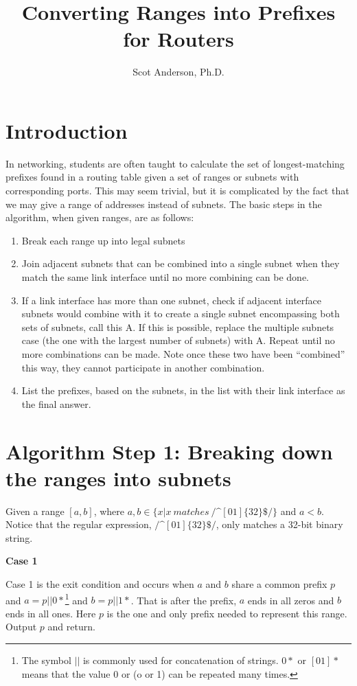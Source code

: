 \documentclass[pdf,bookmarks,colorlinks=true]{article}
\title{Converting Ranges into Prefixes for Routers}
\author{Scot Anderson, Ph.D.}
\theoremstyle{definition}
\begin{document}
\maketitle

\section{Introduction}

In networking, students are often taught to calculate the set of longest-matching prefixes found in a routing table given a set of ranges or subnets with corresponding ports. This may seem trivial, but it is complicated by the fact that we may give a range of addresses instead of subnets. The basic steps in the algorithm, when given ranges, are as follows:

\begin{enumerate}
	\item Break each range up into legal subnets
	\item Join adjacent subnets that can be combined into a single subnet when they match the same link interface until no more combining can be done.
	\item If a link interface has more than one subnet, check if adjacent interface subnets would combine with it to create a single subnet encompassing both sets of subnets, call this A. If this is possible, replace the multiple subnets case (the one with the largest number of subnets) with A. Repeat until no more combinations can be made. Note once these two have been ``combined'' this way, they cannot participate in another combination. 
	\item List the prefixes, based on the subnets, in the list with their link interface as the final answer.   
\end{enumerate}

\section{Algorithm Step 1: Breaking down the ranges into subnets}

Given a range $[a, b]$, where $a, b \in \{x | x~matches~/ \textrm{\textasciicircum} [01]\{32\}\$/\}$ and $a < b$. Notice that the regular expression, $/ \textrm{\textasciicircum} [01]\{32\}\$/$, only matches a 32-bit binary string.\medskip

\textbf{Case 1}

Case 1 is the exit condition and occurs when $a$ and $b$ share a common prefix $p$ and $a = p||0*$\footnote{The symbol $||$ is commonly used for concatenation of strings. $0*$ or $[01]*$ means that the value 0 or (o or 1) can be repeated many times.} and $b = p||1*$. That is after the prefix, $a$ ends in all zeros and $b$ ends in all ones. Here $p$ is the one and only prefix needed to represent this range. Output $p$ and return.\medskip
\end{document}
